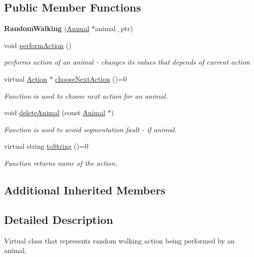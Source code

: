 \subsection*{Public Member Functions}
\begin{DoxyCompactItemize}
\item 
\hypertarget{class_random_walking_a2d78b8e5754d3d12db4811a2f922a963}{}{\bfseries Random\+Walking} (\hyperlink{class_animal}{Animal} $\ast$animal\+\_\+ptr)\label{class_random_walking_a2d78b8e5754d3d12db4811a2f922a963}

\item 
void \hyperlink{class_random_walking_a04a3fc96e180a6c0ab0af7d29e596082}{perform\+Action} ()
\begin{DoxyCompactList}\small\item\em performs action of an animal -\/ changes it\textquotesingle{}s values that depends of current action \end{DoxyCompactList}\item 
virtual \hyperlink{class_action}{Action} $\ast$ \hyperlink{class_random_walking_a7bfc651d40fd17944ed8efcdf58e0559}{choose\+Next\+Action} ()=0
\begin{DoxyCompactList}\small\item\em Function is used to choose next action for an animal. \end{DoxyCompactList}\item 
void \hyperlink{class_random_walking_af8be73eaa8ef5e21f0b127a32b34d4ad}{delete\+Animal} (const \hyperlink{class_animal}{Animal} $\ast$)
\begin{DoxyCompactList}\small\item\em Function is used to avoid segmentation fault -\/ if animal. \end{DoxyCompactList}\item 
virtual string \hyperlink{class_random_walking_a86f089cc5cc28d179e248c67477e8b30}{to\+String} ()=0
\begin{DoxyCompactList}\small\item\em Function returns name of the action. \end{DoxyCompactList}\end{DoxyCompactItemize}
\subsection*{Additional Inherited Members}


\subsection{Detailed Description}
Virtual class that represents random walking action being performed by an animal. 

